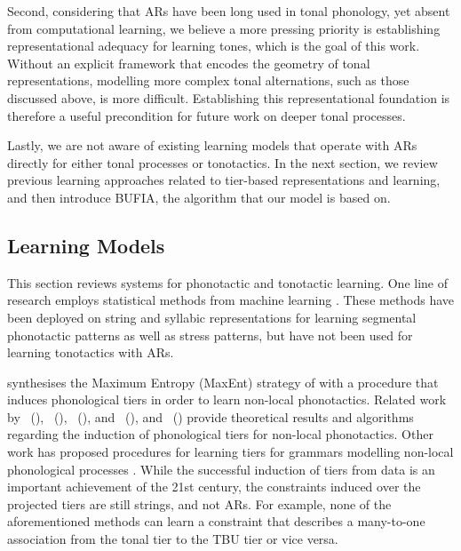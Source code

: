 \documentclass{CUP-JNL-PHO}%
\theoremstyle{definition}
\numberwithin{equation}{section}
\theoremstyle{definition}
\begin{document}
Second, considering that ARs have been long used in tonal phonology, 
yet absent from computational learning, we believe a more pressing 
priority is establishing representational adequacy for learning tones, 
which is the goal of this work.
Without an explicit framework
that encodes the geometry of tonal representations, modelling more
complex tonal alternations, such as those discussed above, is more
difficult. Establishing this representational foundation is therefore
a useful precondition for future work on deeper tonal processes.

Lastly, we are not aware of existing learning models that operate
with ARs directly for either tonal processes or tonotactics. In the next
section, we review previous learning approaches related to tier-based
representations and learning, and then introduce BUFIA, the algorithm
that our model is based on.

\subsection{Learning Models}\label{sec:learning.models}

This section reviews systems for phonotactic and tonotactic
learning. One line of research employs statistical methods from
machine learning \citep{CP97, hayes2008maximum,
	goldsmith2012information}. These methods have
been deployed on string and syllabic representations for learning
segmental phonotactic patterns as well as stress patterns,
but have not been used for learning tonotactics with ARs.

\citet{GouskovaGallagher2020} synthesises the Maximum Entropy (MaxEnt)
strategy of \citet{hayes2008maximum} with a procedure that induces
phonological tiers in order to learn non-local phonotactics. Related
work by
\citeauthor{Jardine-Heinz-2016-LTSLL}~(\citeyear{Jardine-Heinz-2016-LTSLL}),
\citeauthor{jardinemcmullin17}~(\citeyear{jardinemcmullin17}),
\citeauthor{de-santo-aksenova-2021-learning}~(\citeyear{de-santo-aksenova-2021-learning}),
and
\citeauthor{pmlr-v153-lambert21a}~(\citeyear{pmlr-v153-lambert21a}),
and \citeauthor{Swanson2025}~(\citeyear{Swanson2025}) provide
theoretical results and algorithms regarding the induction of
phonological tiers for non-local phonotactics. Other work has proposed
procedures for learning tiers for grammars modelling non-local
phonological processes \citep{BurnessMcMullin2019,
	burness-mcmullin-2021, Belth2024}. While the successful induction of
tiers from data is an important achievement of the 21st century, the
constraints induced over the projected tiers are still strings, and
not ARs. For example, none of the aforementioned methods can learn a
constraint that describes a many-to-one association from the tonal
tier to the TBU tier or vice versa.
\end{document}
